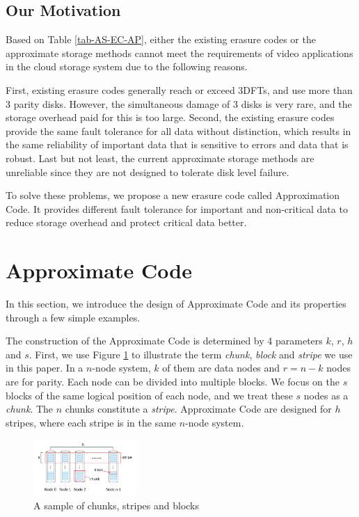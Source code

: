 \documentclass[sigconf]{acmart}
\begin{document}
\subsection{Our Motivation}
Based on Table \ref{tab-AS-EC-AP}, either the existing erasure codes or the approximate storage methods cannot meet the requirements of video applications in the cloud storage system due to the following reasons. 

First, existing erasure codes generally reach or exceed 3DFTs, and use more than 3 parity disks. However, the simultaneous damage of 3 disks is very rare, and the storage overhead paid for this is too large. Second, the existing erasure codes provide the same fault tolerance for all data without distinction, which results in the same reliability of important data that is sensitive to errors and data that is robust. Last but not least, the current approximate storage methods are unreliable since they are not designed to tolerate disk level failure.

To solve these problems, we propose a new erasure code called Approximation Code. It provides different fault tolerance for important and non-critical data to reduce storage overhead and protect critical data better.

\section{Approximate Code}\label{ApCode}
In this section, we introduce the design of Approximate Code and its properties through a few simple examples. 

The construction of the Approximate Code is determined by 4 parameters $k$, $r$, $h$ and $s$. 
First, we use Figure \ref{fig-chunk-block} to illustrate the term \emph{chunk}, \emph{block} and \emph{stripe} we use in this paper. In a $n$-node system, $k$ of them are data nodes and $r=n-k$ nodes are for parity. Each node can be divided into multiple blocks. We focus on the $s$ blocks of the same logical position of each node, and we treat these $s$ nodes as a \emph{chunk}. The $n$ chunks constitute a \emph{stripe}. 
Approximate Code are designed for $h$ stripes, where each stripe is in the same $n$-node system.

\begin{figure}[ht]
\centering
\includegraphics[width=0.35\textwidth]{photo/chunk-block.pdf}
\caption{A sample of chunks, stripes and blocks}
\label{fig-chunk-block}
\end{figure}
\end{document}
